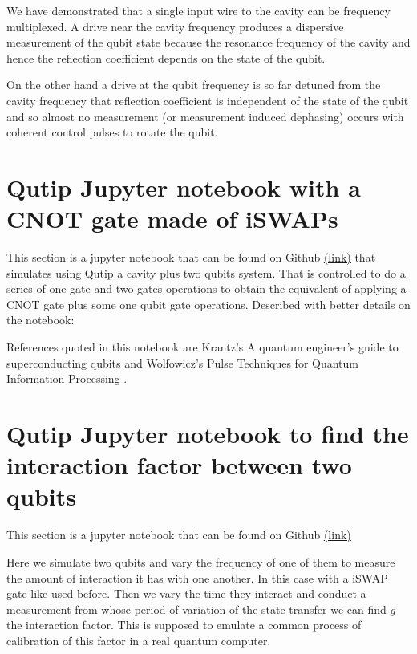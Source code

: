 \documentclass[12pt]{article}
\numberwithin{equation}{subsection}
\newcommand\page[1]{
{
}
}
\begin{document}
\page{84/91}

We have demonstrated that a single input wire to the cavity can be frequency multiplexed. 
A drive near the cavity frequency produces a dispersive measurement of the qubit state because the resonance frequency of the cavity and  hence the reflection coefficient depends on the state of the qubit. 

On the other hand a drive at the qubit frequency is so far detuned from the cavity frequency that reflection coefficient is independent of the state of the qubit and so almost no measurement (or measurement induced dephasing) occurs with coherent control pulses to rotate the qubit.


\section{Qutip Jupyter notebook with a CNOT gate made of iSWAPs}
This section is a jupyter notebook that can be found on Github
\textcolor{blue}{\underline{\hyperlink{https://github.com/Danielgb23/ic-superconductor-qubit/blob/master/2-qubit-gates.ipynb}{(link)}}}
that simulates using Qutip a cavity plus two qubits system. That is controlled to do a series of one gate and two gates operations to obtain the equivalent of applying a CNOT gate plus some one qubit gate operations. Described with better details on the notebook:

References quoted in this notebook are Krantz's A quantum engineer’s guide to superconducting qubits \cite{2019krantz} and Wolfowicz's Pulse Techniques for Quantum Information Processing \cite{Wolfowicz2016PulseProcessing}.

\section{Qutip Jupyter notebook to find the interaction factor between two qubits}
This section is a jupyter notebook that can be found on Github
\textcolor{blue}{\underline{\hyperlink{https://github.com/Danielgb23/ic-superconductor-qubit/blob/master/2-qubit-gates.ipynb }{(link)}}}

Here we simulate two qubits and vary the frequency of one of them to measure the amount of interaction it has with one another. In this case with a iSWAP gate like used before. Then we vary the time they interact and conduct a measurement from whose period of variation of the state transfer we can find $g$ the interaction factor. This is supposed to emulate a common process of calibration of this factor in a real quantum computer.
\end{document}
